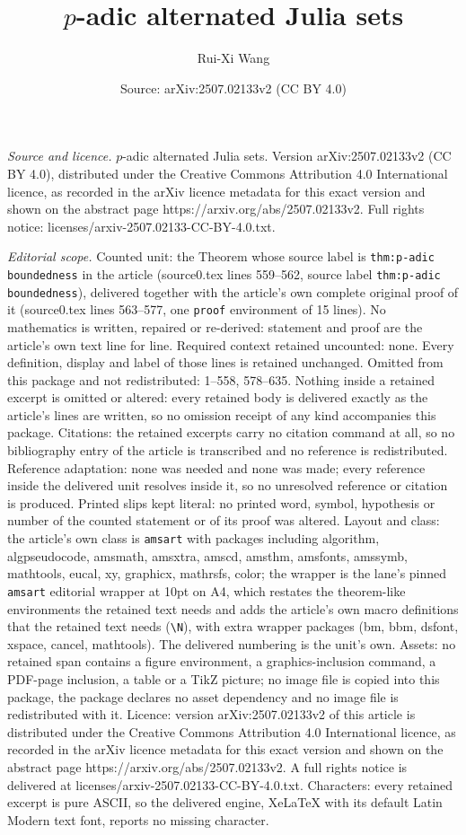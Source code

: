 \documentclass[10pt,a4paper]{amsart}
\title[$p$-adic alternated Julia sets]{$p$-adic alternated Julia sets}
\author{Rui-Xi Wang}
\date{Source: arXiv:2507.02133v2 (CC BY 4.0)}
\begin{document}
\maketitle

\noindent\emph{Source and licence.} $p$-adic alternated Julia sets. Version arXiv:2507.02133v2 (CC BY 4.0), distributed under the Creative Commons Attribution 4.0 International licence, as recorded in the arXiv licence metadata for this exact version and shown on the abstract page https://arxiv.org/abs/2507.02133v2. Full rights notice: licenses/arxiv-2507.02133-CC-BY-4.0.txt.\par\smallskip

\noindent\textit{Editorial scope.} Counted unit: the Theorem whose source label is \texttt{thm:p-adic boundedness} in the article (source0.tex lines 559--562, source label \texttt{thm:p-adic boundedness}), delivered together with the article's own complete original proof of it (source0.tex lines 563--577, one \texttt{proof} environment of 15 lines). No mathematics is written, repaired or re-derived: statement and proof are the article's own text line for line. Required context retained uncounted: none. Every definition, display and label of those lines is retained unchanged. Omitted from this package and not redistributed: 1--558, 578--635. Nothing inside a retained excerpt is omitted or altered: every retained body is delivered exactly as the article's lines are written, so no omission receipt of any kind accompanies this package. Citations: the retained excerpts carry no citation command at all, so no bibliography entry of the article is transcribed and no reference is redistributed. Reference adaptation: none was needed and none was made; every reference inside the delivered unit resolves inside it, so no unresolved reference or citation is produced. Printed slips kept literal: no printed word, symbol, hypothesis or number of the counted statement or of its proof was altered. Layout and class: the article's own class is \texttt{amsart} with packages including algorithm, algpseudocode, amsmath, amsxtra, amscd, amsthm, amsfonts, amssymb, mathtools, eucal, xy, graphicx, mathrsfs, color; the wrapper is the lane's pinned \texttt{amsart} editorial wrapper at 10pt on A4, which restates the theorem-like environments the retained text needs and adds the article's own macro definitions that the retained text needs (\texttt{\textbackslash N}), with extra wrapper packages (bm, bbm, dsfont, xspace, cancel, mathtools). The delivered numbering is the unit's own. Assets: no retained span contains a figure environment, a graphics-inclusion command, a PDF-page inclusion, a table or a TikZ picture; no image file is copied into this package, the package declares no asset dependency and no image file is redistributed with it. Licence: version arXiv:2507.02133v2 of this article is distributed under the Creative Commons Attribution 4.0 International licence, as recorded in the arXiv licence metadata for this exact version and shown on the abstract page https://arxiv.org/abs/2507.02133v2. A full rights notice is delivered at licenses/arxiv-2507.02133-CC-BY-4.0.txt. Characters: every retained excerpt is pure ASCII, so the delivered engine, XeLaTeX with its default Latin Modern text font, reports no missing character.
\end{document}
